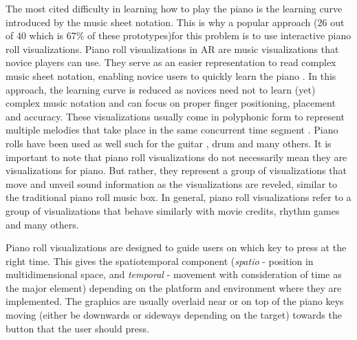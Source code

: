 \documentclass[sigconf, screen, review]{acmart}
\begin{document}
The most cited difficulty in learning how to play the piano is the learning curve introduced by the music sheet notation. This is why a popular approach (26 out of 40 \textendash  which is 67\% of these prototypes)for this problem is to use interactive piano roll visualizations. Piano roll visualizations in AR are music visualizations that novice players can use. They serve as an easier representation to read complex music sheet notation, enabling novice users to quickly learn the piano \cite{walder2016modelling}. In this approach, the learning curve is reduced as novices need not to learn (yet) complex music notation and can focus on proper finger positioning, placement and accuracy. These visualizations usually come in polyphonic form to represent multiple melodies that take place in the same concurrent time segment \cite{ciuha2010visualization}.  Piano rolls have been used as well such for the guitar \cite{biamonte2010musical}, drum \cite{rossignol2015alternate} and many others. It is important to note that piano roll visualizations do not necessarily mean they are visualizations for piano. But rather, they represent a group of visualizations that move and unveil sound information as the visualizations are reveled, similar to the traditional piano roll music box. In general, piano roll visualizations refer to a group of visualizations that behave similarly with movie credits, rhythm games and many others. 

Piano roll visualizations are designed to guide users on which key to press at the right time. This gives the spatiotemporal component (\textit{spatio} - position in multidimensional space, and \textit{temporal} - movement with consideration of time as the major element) depending on the platform and environment where they are implemented. The graphics are usually overlaid near or on top of the piano keys moving (either be downwards or sideways depending on the target) towards the button that the user should press. 
\end{document}
